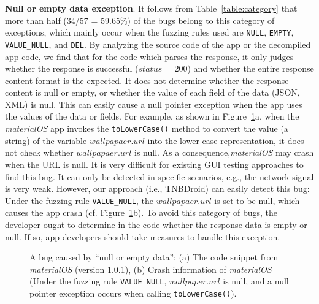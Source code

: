 \documentclass[sigconf,review, anonymous]{acmart}
\begin{document}
\textbf{Null or empty data exception}. It follows from Table~\ref{table:category} that more than half (34/57 = 59.65\%) of the bugs belong to this category of exceptions, which mainly occur when the fuzzing rules used are \texttt{NULL}, \texttt{EMPTY}, \texttt{VALUE\_NULL}, and \texttt{DEL}. By analyzing the source code of the app or the decompiled app code, we find that for the code which parses the response, it only judges whether the response is successful ($status$ = 200) and whether the entire response content format is the expected. It does not determine whether the response content is null or empty, or whether the value of each field of the data (JSON, XML) is null. This can easily cause a null pointer exception when the app uses the values of the data or fields. For example, as shown in Figure~\ref{fig_bug1}a, when the \textit{materialOS} app invokes the \texttt{toLowerCase()} method to convert the value (a string) of the variable $wallpapaer.url$ into the lower case representation, it does not check whether $wallpapaer.url$ is null. As a consequence,\textit{materialOS} may crash when the URL is null. It is very difficult for existing GUI testing approaches to find this bug. It can only be detected in specific scenarios, e.g., the network signal is very weak. However, our approach (i.e., \textsf{TNBDroid}) can easily detect this bug: Under the fuzzing rule \texttt{VALUE\_NULL}, the $wallpapaer.url$ is set to be null, which causes the app crash (cf. Figure~\ref{fig_bug1}b). To avoid this category of bugs, the developer ought to determine in the code whether the response data is empty or null. If so, app developers should take measures to handle this exception.    

\begin{figure}
  \centering
 \subfigure[]{
    }
  \subfigure[]{
    }
  \caption{A bug caused by ``null or empty data'': (a) The code snippet from \textit{materialOS} (version 1.0.1), (b) Crash information of \textit{materialOS} (Under the fuzzing rule \texttt{VALUE\_NULL}, $wallpaper.url$ is null, and a null pointer exception occurs when calling \texttt{toLowerCase()}).}
\label{fig_bug1}
\end{figure}
\end{document}
